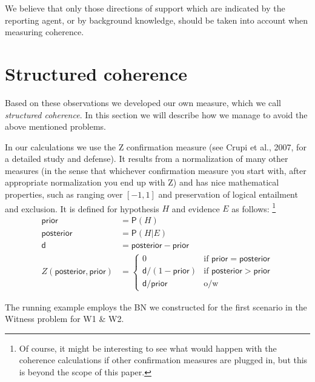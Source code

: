 \documentclass[10pt,]{scrartcl}
\newcommand{\pr}{\mathsf{P}}
\newcommand{\s}[1]{\mbox{\textsf{#1}}}
\begin{document}
We believe that only those directions of support which are indicated by
the reporting agent, or by background knowledge, should be taken into
account when measuring coherence.


\section{Structured coherence}

Based on these observations we developed our own measure, which we call
\textit{structured coherence}. In this section we will describe how we
manage to avoid the above mentioned problems.  


In our calculations we use the \s{Z} confirmation measure (see Crupi et
al., 2007, for a detailed study and defense). It results from a
normalization of many other measures (in the sense that whichever
confirmation measure you start with, after appropriate normalization you
end up with \s{Z}) and has nice mathematical properties, such as ranging
over \([-1,1]\) and preservation of logical entailment and exclusion. It
is defined for hypothesis \(H\) and evidence \(E\) as follows:
\footnote{Of course, it might be interesting to see what would happen
with the coherence calculations if other confirmation measures are
plugged in, but this is beyond the scope of this paper.}
\begin{align*}
   \mathsf{prior} & = \pr(H) \\
   \mathsf{posterior} & = \pr(H \vert E)\\
   \mathsf{d} & = \mathsf{posterior} - \mathsf{prior} \\
       Z(\mathsf{posterior,prior}) & =  \begin{cases}
       0 & \text{if } \mathsf{prior} = \mathsf{posterior}\\
       \mathsf{d}/(1-\mathsf{prior}) & \text{if } \mathsf{posterior} > \mathsf{prior} \\
         \mathsf{d}/\mathsf{prior} & \text{o/w} 
       \end{cases}
   \end{align*}



 The running example employs the BN we
constructed for the first scenario in the \textsf{Witness} problem for \textsf{W1} \& \textsf{W2}.
\end{document}
